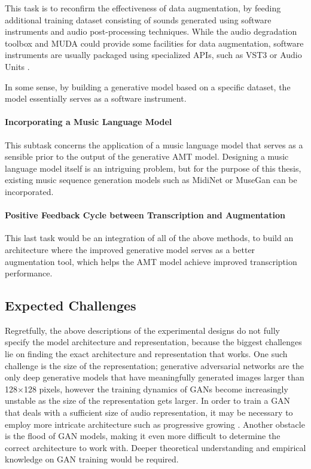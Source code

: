 This task is to reconfirm the effectiveness of data augmentation, by feeding additional training dataset consisting of sounds generated using software instruments and audio post-processing techniques.
While the audio degradation toolbox \cite{mauch2013adt} and MUDA \cite{mcfee2015muda} could provide some facilities for data augmentation, software instruments are usually packaged using specialized APIs, such as VST3 or Audio Units \cite{pirkle2014synthesizer}.

In some sense, by building a generative model based on a specific dataset, the model essentially serves as a software instrument.


\paragraph{Incorporating a Music Language Model}\mbox{}

This subtask concerns the application of a music language model that serves as a sensible prior to the output of the generative AMT model.
Designing a music language model itself is an intriguing problem, but for the purpose of this thesis, existing music sequence generation models such as MidiNet \cite{yang2017midinet} or MuseGan \cite{dong2017musegan} can be incorporated.

\paragraph{Positive Feedback Cycle between Transcription and Augmentation}\mbox{}

This last task would be an integration of all of the above methods, to build an architecture where the improved generative model serves as a better augmentation tool, which helps the AMT model achieve improved transcription performance.


\subsection{Expected Challenges}

Regretfully, the above descriptions of the experimental designs do not fully specify the model architecture and representation, because the biggest challenges lie on finding the exact architecture and representation that works.
One such challenge is the size of the representation; generative adversarial networks are the only deep generative models that have meaningfully generated images larger than 128$\times$128 pixels, however the training dynamics of GANs become increasingly unstable as the size of the representation gets larger.
In order to train a GAN that deals with a sufficient size of audio representation, it may be necessary to employ more intricate architecture such as progressive growing \cite{karras2017pggan}.
Another obstacle is the flood of GAN models, making it even more difficult to determine the correct architecture to work with.
Deeper theoretical understanding and empirical knowledge on GAN training would be required.

